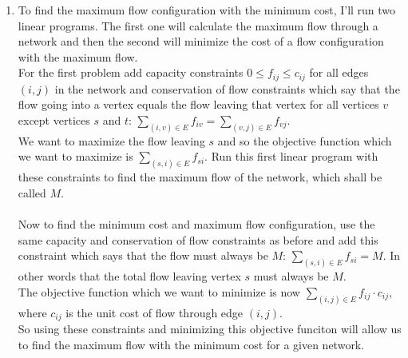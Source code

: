 \documentclass{article}
\begin{document}
\begin{enumerate}
\begin{enumerate}
		\item To find the maximum flow configuration with the minimum cost, I'll run two linear programs.  The first one will calculate the maximum flow through a network and then the second will minimize the cost of a flow configuration with the maximum flow.  \\
		For the first problem add capacity constraints $0\leq f_{ij} \leq c_{ij}$ for all edges $(i,j)$ in the network and conservation of flow constraints which say that the flow going into a vertex equals the flow leaving that vertex for all vertices $v$ except vertices $s$ and $t$: $\displaystyle\sum_{(i,v)\in E} f_{iv} = \sum_{(v,j)\in E}f_{vj}$.  \\
		We want to maximize the flow leaving $s$ and so the objective function which we want to maximize is $\displaystyle\sum_{(s,i) \in E}f_{si}$.  Run this first linear program with these constraints to find the maximum flow of the network, which shall be called $M$.  \\
		\\
		Now to find the minimum cost and maximum flow configuration, use the same capacity and conservation of flow constraints as before and add this constraint which says that the flow must always be $M$: $\displaystyle\sum_{(s,i) \in E}f_{si} = M$.  In other words that the total flow leaving vertex $s$ must always be $M$.  \\
		The objective function which we want to minimize is now $\displaystyle\sum_{(i,j) \in E}f_{ij} \cdot c_{ij}$, where $c_{ij}$ is the unit cost of flow through edge $(i,j)$. \\
		So using these constraints and minimizing this objective funciton will allow us to find the maximum flow with the minimum cost for a given network.   
	\end{enumerate}
	

\end{enumerate}
\end{document}
